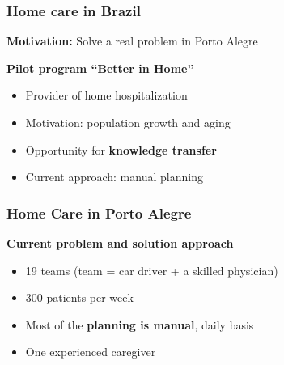 \begin{frame}
   \frametitle{Home care in Brazil}

   \textbf{Motivation: } Solve a real problem in Porto Alegre

   \vspace{12pt}

   \textbf{Pilot program ``Better in Home''}
   \begin{itemize}
      \item Provider of home hospitalization
      \item Motivation: population growth and aging
      \item Opportunity for \textbf{knowledge transfer}
      \item Current approach: manual planning
   \end{itemize}

\end{frame}

\begin{frame}
   \frametitle{Home Care in Porto Alegre}

   \textbf{Current problem and solution approach}
   \begin{itemize}
      \item 19 teams (team = car driver + a skilled physician)
      \item 300 patients per week
      \item Most of the \textbf{planning is manual}, daily basis
      \item One experienced caregiver
   \end{itemize}


\end{frame}

